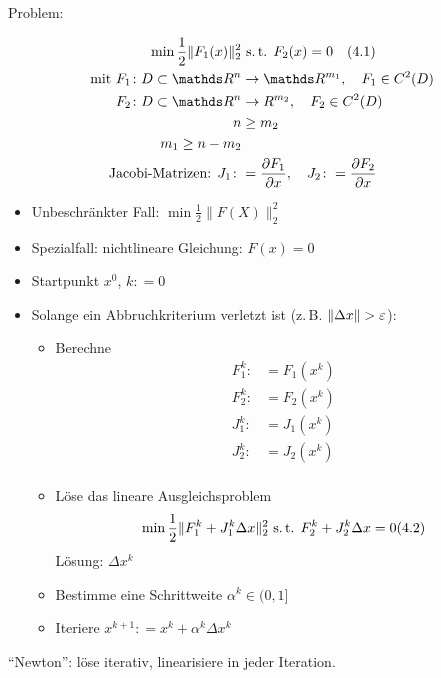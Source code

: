 
Problem:

\begin{align*}
\min \frac 12 \|F_1(x)\|_2^2 &\text{ s.\,t. } F_2(x) = 0 \quad (4.1) \\
\text{ mit } F_1\colon D \subset \R^n  &\to \R^{m_1}, \quad F_1 \in C^2(D) \\
F_2\colon D \subset \R^n &\to R^{m_2}, \quad F_2 \in C^2(D) \\
n & \geq m_2 \\
m_1 \geq n - m_2 \\
\text{Jacobi-Matrizen: } J_1 \colon&= \frac{\partial F_1}{\partial x}, \quad J_2 \colon= \frac{\partial F_2}{\partial x}
\end{align*}

\begin{itemize}
\item Unbeschränkter Fall: $\min \frac 12 \|F(X)\|_2^2$
\item Spezialfall: nichtlineare Gleichung: $F(x) = 0$
\end{itemize}


\begin{itemize}
\item Startpunkt $x^0$, $k \colon= 0$
\item Solange ein Abbruchkriterium verletzt ist (z.\,B. $\|\Delta x\| > \varepsilon$):
\begin{itemize}
\item Berechne
\begin{align*}
F_1^k \colon&= F_1(x^k) \\
F_2^k \colon&= F_2(x^k) \\
J_1^k \colon&= J_1(x^k) \\
J_2^k \colon&= J_2(x^k) \\
\end{align*}
\item Löse das lineare Ausgleichsproblem
\[ \min \frac 12 \|F_1^k + J_1^k \Delta x \|_2^2 \text{ s.\,t. } F_2^k + J_2^k \Delta x = 0 (4.2) \]
Lösung: $\Delta x^k$
\item Bestimme eine Schrittweite $\alpha^k \in (0,1]$
\item Iteriere $x^{k+1} \colon= x^k + \alpha^k \Delta x^k$
\end{itemize}
\end{itemize}

"`Newton"': löse iterativ, linearisiere in jeder Iteration.

